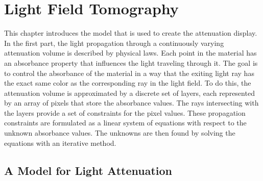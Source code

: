 \chapter{Light Field Tomography}
\label{chp:light_field_tomography}

This chapter introduces the model that is used to create the attenuation display.
In the first part, the light propagation through a continuously varying attenuation volume is described by physical laws.
Each point in the material has an absorbance property that influences the light traveling through it.
The goal is to control the absorbance of the material in a way that the exiting light ray has the exact same color as the corresponding ray in the light field.
To do this, the attenuation volume is approximated by a discrete set of layers, each represented by an array of pixels that store the absorbance values.
The rays intersecting with the layers provide a set of constraints for the pixel values.
These propagation constraints are formulated as a linear system of equations with respect to the unknown absorbance values.
The unknowns are then found by solving the equations with an iterative method.

\section{A Model for Light Attenuation}
\label{sec:light_attenuation_model}

